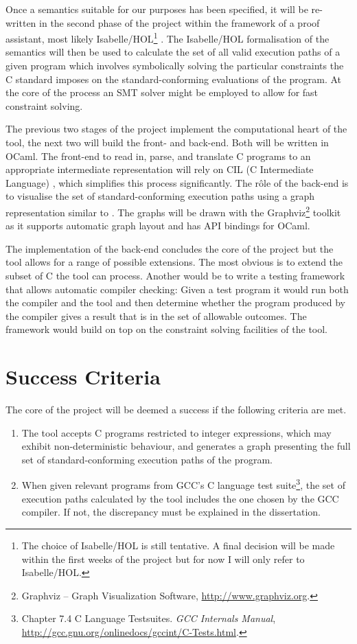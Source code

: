 \documentclass[12pt,a4paper,titlepage]{article}
\begin{document}
Once a semantics suitable for our purposes has been specified, it will be re-written in the second phase of the project within the framework of a proof assistant, most likely Isabelle/HOL\footnote{The choice of Isabelle/HOL is still tentative. A final decision will be made within the first weeks of the project but for now I will only refer to Isabelle/HOL.} \cite{isabelle}. The Isabelle/HOL formalisation of the semantics will then be used to calculate the set of all valid execution paths of a given program which involves symbolically solving the particular constraints the C standard imposes on the standard-conforming evaluations of the program. At the core of the process an SMT solver might be employed to allow for fast constraint solving.

The previous two stages of the project implement the computational heart of the tool, the next two will build the front- and back-end. Both will be written in OCaml. The front-end to read in, parse, and translate C programs to an appropriate intermediate representation will rely on CIL (C Intermediate Language) \cite{cil}, which simplifies this process significantly. The r\^ole of the back-end is to visualise the set of standard-conforming execution paths using a graph representation similar to \cite{cpp}. The graphs will be drawn with the Graphviz\footnote{Graphviz -- Graph Visualization Software, \url{http://www.graphviz.org}.} toolkit as it supports automatic graph layout and has API bindings for OCaml.

The implementation of the back-end concludes the core of the project but the tool allows for a range of possible extensions. The most obvious is to extend the subset of C the tool can process.
Another would be to write a testing framework that allows automatic compiler checking: Given a test program it would run both the compiler and the tool and then determine whether the program produced by the compiler gives a result that is in the set of allowable outcomes. The framework would build on top on the constraint solving facilities of the tool.

\section*{Success Criteria}
The core of the project will be deemed a success if the following criteria are met.
\begin{enumerate}
 \item The tool accepts C programs restricted to integer expressions, which may exhibit non-deterministic behaviour, and generates a graph presenting the full set of standard-conforming execution paths of the program.
 \item When given relevant programs from GCC's C language test suite\footnote{Chapter 7.4 C Language Testsuites. \textit{GCC Internals Manual}, \url{http://gcc.gnu.org/onlinedocs/gccint/C-Tests.html}.}, the set of execution paths calculated by the tool includes the one chosen by the GCC compiler. If not, the discrepancy must be explained in the dissertation.
\end{enumerate}
\end{document}
